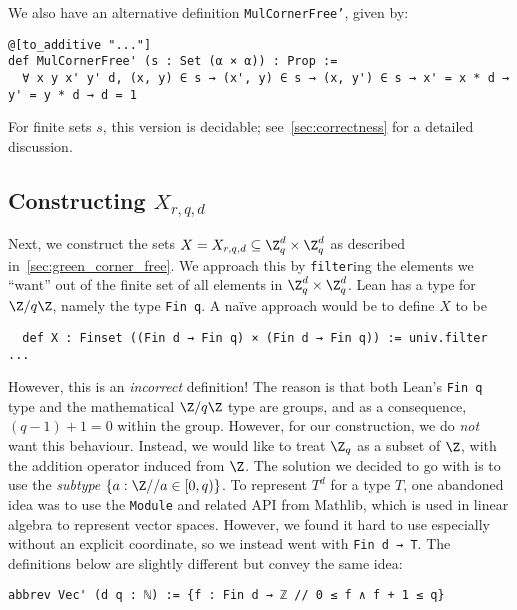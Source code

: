 We also have an alternative definition \texttt{MulCornerFree'}, given by:

\begin{verbatim}
@[to_additive "..."]
def MulCornerFree' (s : Set (α × α)) : Prop :=
  ∀ x y x' y' d, (x, y) ∈ s → (x', y) ∈ s → (x, y') ∈ s → x' = x * d → y' = y * d → d = 1
\end{verbatim}

For finite sets \(s\), this version is decidable; see~\cref{sec:correctness} for a detailed discussion.

\subsection{Constructing \(X_{r, q, d}\)}

Next, we construct the sets \(X = X_{r, q, d} \subseteq \Z_q^d \times \Z_q^d\) as described in~\cref{sec:green_corner_free}. We approach this by \texttt{filter}ing the elements we ``want'' out of the finite set of all elements in \(\Z_q^d \times \Z_q^d\). Lean has a type for \(\Z / q\Z\), namely the type \texttt{Fin q}. A naïve approach would be to define \(X\) to be

\begin{verbatim}
  def X : Finset ((Fin d → Fin q) × (Fin d → Fin q)) := univ.filter ...
\end{verbatim}

However, this is an \textit{incorrect} definition! The reason is that both Lean's \texttt{Fin q} type and the mathematical \(\Z / q\Z\) type are groups, and as a consequence, \((q - 1) + 1 = 0\) within the group. However, for our construction, we do \textit{not} want this behaviour. Instead, we would like to treat \(\Z_q\) as a subset of \(\Z\), with the addition operator induced from \(\Z\). The solution we decided to go with is to use the \textit{subtype} \(\{ a : \Z // a \in [0, q) \}\). To represent \(T^d\) for a type \(T\), one abandoned idea was to use the \texttt{Module} and related API from Mathlib, which is used in linear algebra to represent vector spaces. However, we found it hard to use especially without an explicit coordinate, so we instead went with \texttt{Fin d → T}. The definitions below are slightly different but convey the same idea:

\begin{verbatim}
abbrev Vec' (d q : ℕ) := {f : Fin d → ℤ // 0 ≤ f ∧ f + 1 ≤ q}
\end{verbatim}

